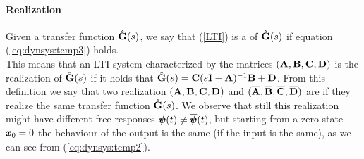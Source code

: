 	\paragraph{Realization} Given a transfer function $\hat {\mathbf{G}}(s)$, we say that (\ref{LTI}) is a  of $\hat {\mathbf{G}}(s)$ if equation (\ref{eq:dynsys:temp3}) holds.\\
	This means that an LTI system characterized by the matrices $(\mathbf{A},\mathbf{B},\mathbf{C},\mathbf{D})$ is the realization of $\hat {\mathbf{G}}(s)$ if it holds that $\hat {\mathbf{G}}(s) = \mathbf{C}(s\mathbf{I}-\mathbf{A})^{-1}\mathbf{B} + \mathbf{D}$. From this definition we say that two realization $(\mathbf{A},\mathbf{B},\mathbf{C},\mathbf{D})$ and $(\overline {\mathbf{A}},\overline {\mathbf{B}},\overline {\mathbf{C}},\overline {\mathbf{D}})$ are  if they realize the same transfer function $\hat {\mathbf{G}}(s)$. We observe that still this realization might have different free responses $\pmb{\psi} (t) \neq \overline{\pmb{\psi}}(t)$, but starting from a zero state $\pmb{x}_0=0$ the behaviour of the output is the same (if the input is the same), as we can see from (\ref{eq:dynsys:temp2}).
	
